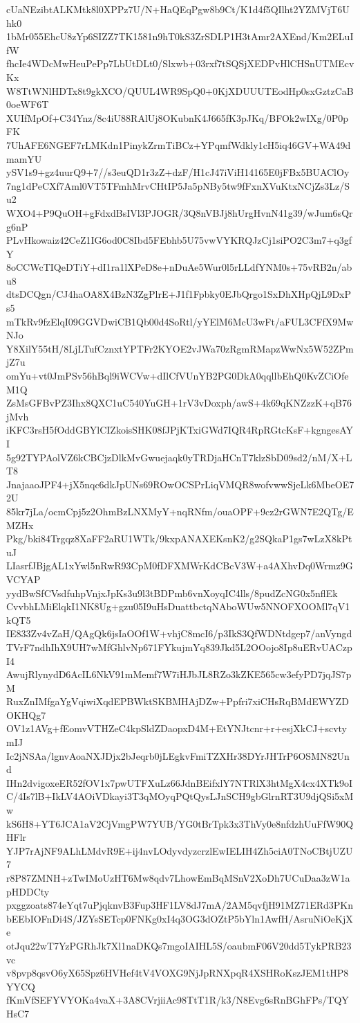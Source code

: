 cUaNEzibtALKMtk8l0XPPz7U/N+HaQEqPgw8b9Ct/K1d4f5QIlht2YZMVjT6Uhk0
1bMr055EhcU8zYp6SIZZ7TK1581n9hT0kS3ZrSDLP1H3tAmr2AXEnd/Km2ELuIfW
fhcIe4WDcMwHeuPePp7LbUtDLt0/Slxwb+03rxf7tSQSjXEDPvHlCHSnUTMEcvKx
W8TtWNlHDTx8t9gkXCO/QUUL4WR9SpQ0+0KjXDUUUTEodHp0sxGztzCaB0oeWF6T
XUIfMpOf+C34Ynz/8c4iU88RAlUj8OKubnK4J665fK3pJKq/BFOk2wIXg/0P0pFK
7UhAFE6NGEF7rLMKdn1PinykZrmTiBCz+YPqmfWdkly1cH5iq46GV+WA49dmamYU
ySV1s9+gz4uurQ9+7//s3euQD1r3zZ+dzF/H1cJ47iViH14165E0jFBx5BUAClOy
7ng1dPeCXf7Aml0VT5TFmhMrvCHtIP5Ja5pNBy5tw9fFxnXVuKtxNCjZs3Lz/Su2
WXO4+P9QuOH+gFdxdBsIVl3PJOGR/3Q8nVBJj8hUrgHvnN41g39/wJum6sQrg6nP
PLvHkowaiz42CeZ1IG6od0C8Ibd5FEbhb5U75vwVYKRQJzCj1siPO2C3m7+q3gfY
8oCCWcTIQeDTiY+dI1ra1lXPeD8e+nDuAe5Wur0l5rLLdfYNM0s+75vRB2n/abu8
dtsDCQgn/CJ4haOA8X4BzN3ZgPlrE+J1f1Fpbky0EJbQrgo1SxDhXHpQjL9DxPs5
mTkRv9fzElqI09GGVDwiCB1Qb00d4SoRtl/yYElM6McU3wFt/aFUL3CFfX9MwNJo
Y8XilY55tH/8LjLTufCznxtYPTFr2KYOE2vJWa70zRgmRMapzWwNx5W52ZPmjZ7u
omYu+vt0JmPSv56hBql9iWCVw+dIlCfVUnYB2PG0DkA0qqllbEhQ0KvZCiOfeM1Q
ZsMsGFBvPZ3Ihx8QXC1uC540YuGH+1rV3vDoxph/awS+4k69qKNZzzK+qB76jMvh
iKFC3rsH5fOddGBYlCIZkoisSHK08fJPjKTxiGWd7IQR4RpRGtcKsF+kgngesAYI
5g92TYPAolVZ6kCBCjzDlkMvGwuejaqk0yTRDjaHCnT7klzSbD09sd2/nM/X+LT8
JnajaaoJPF4+jX5nqc6dkJpUNs69ROwOCSPrLiqVMQR8wofvwwSjeLk6MbeOE72U
85kr7jLa/ocmCpj5z2OhmBzLNXMyY+nqRNfm/ouaOPF+9cz2rGWN7E2QTg/EMZHx
Pkg/bki84Trgqz8XaFF2aRU1WTk/9kxpANAXEKsnK2/g2SQkaP1gs7wLzX8kPtuJ
LIasrfJBjgAL1xYwl5nRwR93CpM0fDFXMWrKdCBcV3W+a4AXhvDq0Wrmz9GVCYAP
yydBwSfCVsdfuhpVnjxJpKs3u9l3tBDPmb6vnXoyqIC4lls/8pudZcNG0x5nflEk
CvvbhLMiElqkI1NK8Ug+gzu05I9uHsDuattbctqNAboWUw5NNOFXOOMl7qV1kQT5
IE833Zv4vZaH/QAgQk6jsIaOOf1W+vhjC8mcI6/p3IkS3QfWDNtdgep7/anVyngd
TVrF7ndhIhX9UH7wMfGhlvNp671FYkujmYq839Jkd5L2OOojo8Ip8uERvUACzpI4
AwujRlynydD6AcIL6NkV91mMemf7W7iHJbJL8RZo3kZKE565cw3efyPD7jqJS7pM
RuxZnIMfgaYgVqiwiXqdEPBWktSKBMHAjDZw+Ppfri7xiCHsRqBMdEWYZDOKHQg7
OV1z1AVg+fEomvVTHZeC4kpSldZDaopxD4M+EtYNJtcnr+r+esjXkCJ+scvtymIJ
Ic2jNSAa/lgnvAoaNXJDjx2bJeqrb0jLEgkvFmiTZXHr38DYrJHTrP6OSMN82Und
IHn2dvigoxeER52fOV1x7pwUTFXuLz66JdnBEifxlY7NTRlX3htMgX4cx4XTk9oI
C/4Is7lB+IkLV4AOiVDkayi3T3qMOyqPQtQysLJnSCH9gbGlrnRT3U9djQSi5xMw
kS6H8+YT6JCA1aV2CjVmgPW7YUB/YG0tBrTpk3x3ThVy0e8nfdzhUuFfW90QHFlr
YJP7rAjNF9ALhLMdvR9E+ij4nvLOdyvdyzcrzlEwIELIH4Zh5ciA0TNoCBtjUZU7
r8P87ZMNH+zTwIMoUzHT6Mw8qdv7LhowEmBqMSnV2XoDh7UCuDaa3zW1apHDDCty
pxggzoats874eYqt7uPjqknvB3Fup3HF1LV8dJ7mA/2AM5qvfjH91MZ71ERd3PKn
bEEbIOFnDi4S/JZYsSETcp0FNKg0xI4q3OG3dOZtP5bYln1AwfH/AsruNiOeKjXe
otJqu22wT7YzPGRhJk7Xl1naDKQs7mgoIAIHL5S/oaubmF06V20dd5TykPRB23vc
v8pvp8qsvO6yX65Spz6HVHef4tV4VOXG9NjJpRNXpqR4XSHRoKszJEM1tHP8YYCQ
fKmVfSEFYVYOKa4vaX+3A8CVrjiiAc98TtT1R/k3/N8Evg6sRnBGhFPs/TQYHsC7
